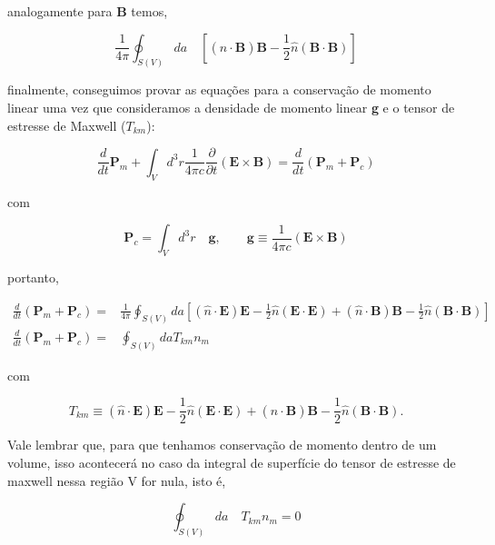 analogamente para \textbf{B} temos,

\begin{equation}
	\frac{1}{4\pi }\oint_{S(V)} da\quad \left[ (\hat{n}\cdot \textbf{B})\textbf{B} - \frac{1}{2}\hat{n} (\textbf{B}\cdot\textbf{B})\right]
\end{equation}

finalmente, conseguimos provar as equações para a conservação de momento linear uma vez que consideramos a densidade de momento linear \textbf{g} e o tensor de estresse de Maxwell ($T_{km}$):

\begin{equation}
	\frac{d}{dt} \textbf{P}_m + \int_V d^3 r \frac{1}{4\pi c} \frac{\partial}{\partial t}\left( \textbf{E} \times \textbf{B}\right) = \frac{d}{dt}\left(\textbf{P}_m + \textbf{P}_c \right)
\end{equation}
 
 com 
 
\begin{equation*}
	\textbf{P}_c =  \int_V d^3 r \quad\textbf{g}, \qquad \textbf{g} \equiv \frac{1}{4\pi c}\left( \textbf{E} \times \textbf{B}\right)
\end{equation*}

portanto, 

\begin{equation}
	\begin{split}
	\frac{d}{dt}\left(\textbf{P}_m + \textbf{P}_c \right) = & \frac{1}{4\pi}\oint_{S(V)} da	\left[ (\hat{n}\cdot \textbf{E})\textbf{E} - \frac{1}{2}\hat{n} (\textbf{E}\cdot\textbf{E}) + (\hat{n}\cdot \textbf{B})\textbf{B} - \frac{1}{2}\hat{n} (\textbf{B}\cdot\textbf{B})\right] \\
	\frac{d}{dt}\left(\textbf{P}_m + \textbf{P}_c \right) = & \oint_{S(V)} da T_{km}n_m
	\end{split}
\end{equation}

com

\begin{equation}
	T_{km} \equiv (\hat{n}\cdot \textbf{E})\textbf{E} - \frac{1}{2}\hat{n} (\textbf{E}\cdot\textbf{E}) +(\hat{n}\cdot \textbf{B})\textbf{B} - \frac{1}{2}\hat{n} (\textbf{B}\cdot\textbf{B}).
\end{equation}

Vale lembrar que, para que tenhamos conservação de momento dentro de um volume, isso acontecerá no caso da integral de superfície do tensor de estresse de maxwell nessa região V for nula, isto é,


\begin{equation}
	\oint_{S(V)} da \quad T_{km}n_m = 0
\end{equation}